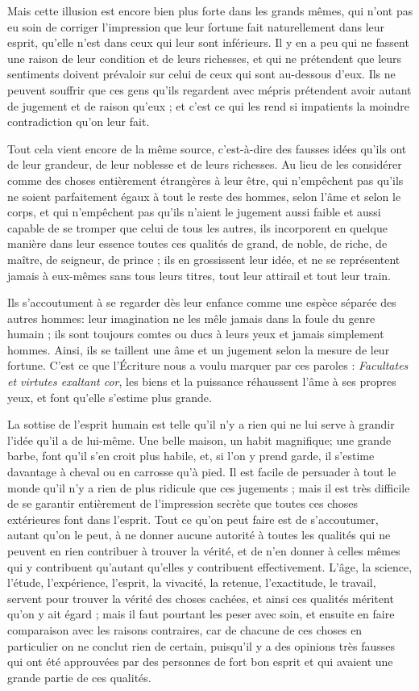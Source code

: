Mais cette illusion est encore bien plus forte dans les grands mêmes, qui n'ont pas eu soin de corriger l'impression que leur fortune fait naturellement dans leur esprit, qu'elle n'est dans ceux qui leur sont inférieurs. Il y en a peu qui ne fassent une raison de leur condition et de leurs richesses, et qui ne prétendent que leurs sentiments doivent prévaloir sur celui de ceux qui sont au-dessous d'eux. Ils ne peuvent souffrir que ces gens qu'ils regardent avec mépris prétendent avoir autant de jugement et de raison qu'eux ; et c'est ce qui les rend si impatients la moindre contradiction qu'on leur fait.

Tout cela vient encore de la même source, c'est-à-dire des fausses idées qu'ils ont de leur grandeur, de leur noblesse et de leurs richesses. Au lieu de les considérer comme des choses entièrement étrangères à leur être, qui n'empêchent pas qu'ils ne soient parfaitement égaux à tout le reste des hommes, selon l'âme et selon le corps, et qui n'empêchent pas qu'ils n'aient le jugement aussi faible et aussi capable de se tromper que celui de tous les autres, ils incorporent en quelque manière dans leur essence toutes ces qualités de grand, de noble, de riche, de maître, de seigneur, de prince ; ils en grossissent leur idée, et ne se représentent jamais à eux-mêmes sans tous leurs titres, tout leur attirail et tout leur train.

Ils s'accoutument à se regarder dès leur enfance comme une espèce séparée des autres hommes: leur imagination ne les mêle jamais dans la foule du genre humain ; ils sont toujours comtes ou ducs à leurs yeux et jamais simplement hommes. Ainsi, ils se taillent une âme et un jugement selon la mesure de leur fortune. C'est ce que l'Écriture nous a voulu marquer par ces paroles : \emph{Facultates et virtutes exaltant cor}, les biens et la puissance réhaussent l'âme à ses propres yeux, et font qu'elle s'estime plus grande.

La sottise de l'esprit humain est telle qu'il n'y a rien qui ne lui serve à grandir l'idée qu'il a de lui-même. Une belle maison, un habit magnifique; une grande barbe, font qu'il s'en croit plus habile, et, si l'on y prend garde, il s'estime davantage à cheval ou en carrosse qu'à pied. Il est facile de persuader à tout le monde qu'il n'y a rien de plus ridicule que ces jugements ; mais il est très difficile de se garantir entièrement de l'impression secrète que toutes ces choses extérieures font dans l'esprit. Tout ce qu'on peut faire est de s'accoutumer, autant qu'on le peut, à ne donner aucune autorité à toutes les qualités qui ne peuvent en rien contribuer à trouver la vérité, et de n'en donner à celles mêmes qui y contribuent qu'autant qu'elles y contribuent effectivement. L'âge, la science, l'étude, l'expérience, l'esprit, la vivacité, la retenue, l'exactitude, le travail, servent pour trouver la vérité des choses cachées, et ainsi ces qualités méritent qu'on y ait égard ; mais il faut pourtant les peser avec soin, et ensuite en faire comparaison avec les raisons contraires, car de chacune de ces choses en particulier on ne conclut rien de certain, puisqu'il y a des opinions très fausses qui ont été approuvées par des personnes de fort bon esprit et qui avaient une grande partie de ces qualités.

